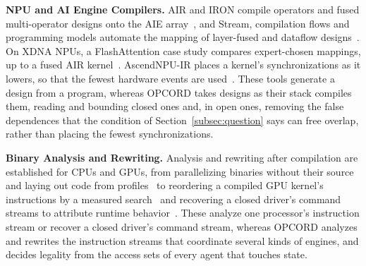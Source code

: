 \textbf{NPU and AI Engine Compilers.}
AIR and IRON compile operators and fused multi-operator designs onto the AIE array~\citep{wang2026mlirair,hunhoff2025iron}, and Stream, compilation flows and programming models automate the mapping of layer-fused and dataflow designs~\citep{symons2025stream,zhuang2025aries,danopoulos2025aie4ml,chen2024allo,fang2025dato}.
On XDNA NPUs, a FlashAttention case study compares expert-chosen mappings, up to a fused AIR kernel~\citep{wang2026flashattention}.
AscendNPU-IR places a kernel's synchronizations as it lowers, so that the fewest hardware events are used~\citep{ascend-autosync}.
These tools generate a design from a program, whereas OPCORD takes designs as their stack compiles them, reading and bounding closed ones and, in open ones, removing the false dependences that the condition of Section~\ref{subsec:question} says can free overlap, rather than placing the fewest synchronizations.

\textbf{Binary Analysis and Rewriting.}
Analysis and rewriting after compilation are established for CPUs and GPUs, from parallelizing binaries without their source~\citep{kotha2010automatic} and laying out code from profiles~\citep{panchenko2019bolt} to reordering a compiled GPU kernel's instructions by a measured search~\citep{he2025cuasmrl} and recovering a closed driver's command streams to attribute runtime behavior~\citep{yan2026revealing}.
These analyze one processor's instruction stream or recover a closed driver's command stream, whereas OPCORD analyzes and rewrites the instruction streams that coordinate several kinds of engines, and decides legality from the access sets of every agent that touches state.

